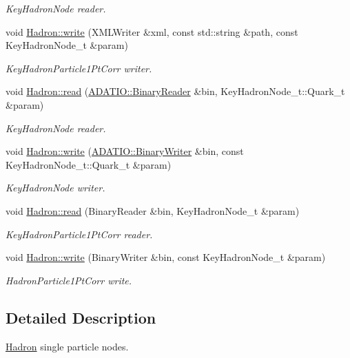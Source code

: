 \begin{DoxyCompactItemize}
\begin{DoxyCompactList}\small\item\em Key\+Hadron\+Node reader. \end{DoxyCompactList}\item 
void \mbox{\hyperlink{namespaceHadron_ab67658d0abad845f6efa3ba94de7692c}{Hadron\+::write}} (X\+M\+L\+Writer \&xml, const std\+::string \&path, const Key\+Hadron\+Node\+\_\+t \&param)
\begin{DoxyCompactList}\small\item\em Key\+Hadron\+Particle1\+Pt\+Corr writer. \end{DoxyCompactList}\item 
void \mbox{\hyperlink{namespaceHadron_a60758467521910899dec197e7fbc0ab4}{Hadron\+::read}} (\mbox{\hyperlink{classADATIO_1_1BinaryReader}{A\+D\+A\+T\+I\+O\+::\+Binary\+Reader}} \&bin, Key\+Hadron\+Node\+\_\+t\+::\+Quark\+\_\+t \&param)
\begin{DoxyCompactList}\small\item\em Key\+Hadron\+Node reader. \end{DoxyCompactList}\item 
void \mbox{\hyperlink{namespaceHadron_ae47780c59de1d15679cc11611947b313}{Hadron\+::write}} (\mbox{\hyperlink{classADATIO_1_1BinaryWriter}{A\+D\+A\+T\+I\+O\+::\+Binary\+Writer}} \&bin, const Key\+Hadron\+Node\+\_\+t\+::\+Quark\+\_\+t \&param)
\begin{DoxyCompactList}\small\item\em Key\+Hadron\+Node writer. \end{DoxyCompactList}\item 
void \mbox{\hyperlink{namespaceHadron_ac376de4f56715288fc1a3eb4e0cc6725}{Hadron\+::read}} (Binary\+Reader \&bin, Key\+Hadron\+Node\+\_\+t \&param)
\begin{DoxyCompactList}\small\item\em Key\+Hadron\+Particle1\+Pt\+Corr reader. \end{DoxyCompactList}\item 
void \mbox{\hyperlink{namespaceHadron_a33192b7d206ee95549b4605c3db6cde8}{Hadron\+::write}} (Binary\+Writer \&bin, const Key\+Hadron\+Node\+\_\+t \&param)
\begin{DoxyCompactList}\small\item\em Hadron\+Particle1\+Pt\+Corr write. \end{DoxyCompactList}\end{DoxyCompactItemize}


\subsection{Detailed Description}
\mbox{\hyperlink{namespaceHadron}{Hadron}} single particle nodes. 

